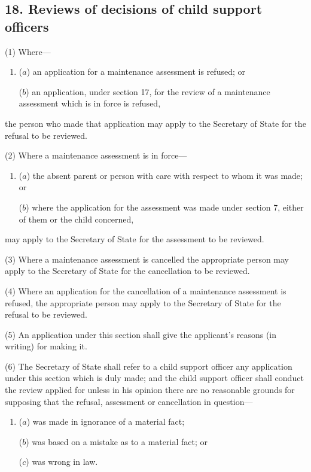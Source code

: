 \documentclass[12pt,a4paper]{article}
\begin{document}
\subsection{18. Reviews of decisions of child support officers}

(1) Where—
\begin{enumerate}\item[]
($a$) an application for a maintenance assessment is refused; or

($b$) an application, under section 17, for the review of a maintenance assessment which is in force is refused,
\end{enumerate}
the person who made that application may apply to the Secretary of State for the refusal to be reviewed.

(2) Where a maintenance assessment is in force—
\begin{enumerate}\item[]
($a$) the absent parent or person with care with respect to whom it was made; or

($b$) where the application for the assessment was made under section 7, either of them or the child concerned,
\end{enumerate}
may apply to the Secretary of State for the assessment to be reviewed.

(3) Where a maintenance assessment is cancelled the appropriate person may apply to the Secretary of State for the cancellation to be reviewed.

(4) Where an application for the cancellation of a maintenance assessment is refused, the appropriate person may apply to the Secretary of State for the refusal to be reviewed.

(5) An application under this section shall give the applicant’s reasons (in writing) for making it.

(6) The Secretary of State shall refer to a child support officer any application under this section which is duly made; and the child support officer shall conduct the review applied for unless in his opinion there are no reasonable grounds for supposing that the refusal, assessment or cancellation in question—
\begin{enumerate}\item[]
($a$) was made in ignorance of a material fact;

($b$) was based on a mistake as to a material fact;
or  %

($c$) was wrong in law.
\end{enumerate}
\end{document}
